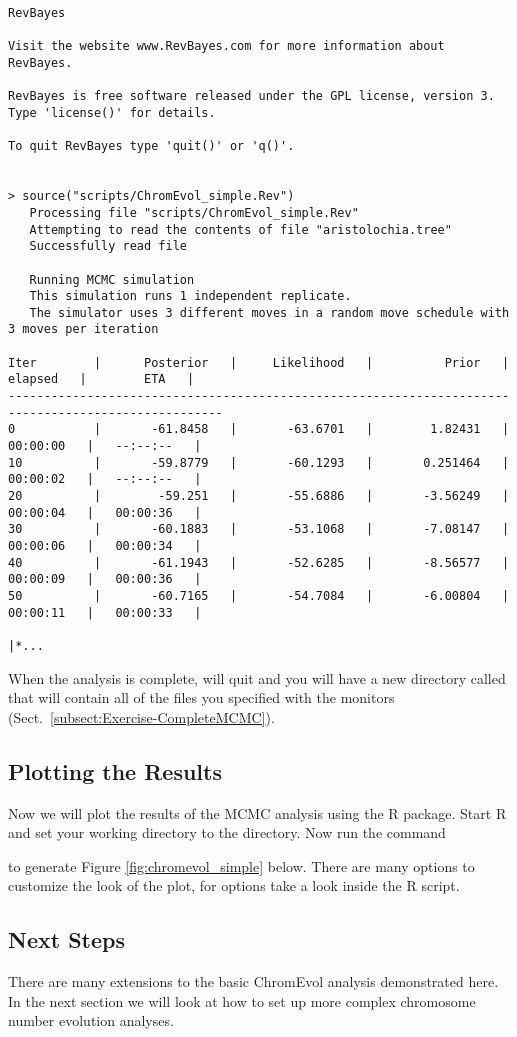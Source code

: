 {\tiny{\tt \begin{snugshade*}
\begin{lstlisting}
RevBayes

Visit the website www.RevBayes.com for more information about RevBayes.

RevBayes is free software released under the GPL license, version 3. Type 'license()' for details.

To quit RevBayes type 'quit()' or 'q()'.


> source("scripts/ChromEvol_simple.Rev")
   Processing file "scripts/ChromEvol_simple.Rev"
   Attempting to read the contents of file "aristolochia.tree"
   Successfully read file

   Running MCMC simulation
   This simulation runs 1 independent replicate.
   The simulator uses 3 different moves in a random move schedule with 3 moves per iteration

Iter        |      Posterior   |     Likelihood   |          Prior   |    elapsed   |        ETA   |
----------------------------------------------------------------------------------------------------
0           |       -61.8458   |       -63.6701   |        1.82431   |   00:00:00   |   --:--:--   |
10          |       -59.8779   |       -60.1293   |       0.251464   |   00:00:02   |   --:--:--   |
20          |        -59.251   |       -55.6886   |       -3.56249   |   00:00:04   |   00:00:36   |
30          |       -60.1883   |       -53.1068   |       -7.08147   |   00:00:06   |   00:00:34   |
40          |       -61.1943   |       -52.6285   |       -8.56577   |   00:00:09   |   00:00:36   |
50          |       -60.7165   |       -54.7084   |       -6.00804   |   00:00:11   |   00:00:33   |

|*...
\end{lstlisting}
\end{snugshade*}}}

When the analysis is complete, \RevBayes will quit and you will have a new directory called  that will contain all of the files you specified with the monitors (Sect.\ \ref{subsect:Exercise-CompleteMCMC}).

\subsection{Plotting the Results}

Now we will plot the results of the MCMC analysis using the \RevGadgets R package.
Start R and set your working directory to the 
directory. Now run the command
\colorbox{black}{\strut\hspace{1mm}\textcolor[rgb]{0,1,1}{}} to generate Figure \ref{fig:chromevol_simple} below. There are many options to customize
the look of the plot, for options take a look inside the R script.

\subsection{Next Steps}

There are many extensions to the basic ChromEvol analysis demonstrated here. In the next
section we will look at how to set up more complex chromosome number evolution analyses.

 

\newpage
